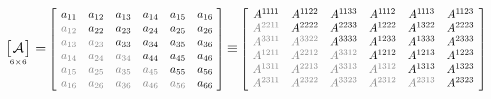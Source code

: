 \begin{gather*}%
\displaystyle
\asmatrixwithdimensions{\mathcal{A}}{6}{6}
\hspace{.1ex} = \hspace{-0.2ex}
\scalebox{.82}{$ \left[ \hspace{.4em}
   \begin{matrix}
      a_{11} & a_{12} & a_{13} & a_{14} & a_{15} & a_{16} \\
      \mathgray{a_{12}} & a_{22} & a_{23} & a_{24} & a_{25} & a_{26} \\
      \mathgray{a_{13}} & \mathgray{a_{23}} & a_{33} & a_{34} & a_{35} & a_{36} \\
      \mathgray{a_{14}} & \mathgray{a_{24}} & \mathgray{a_{34}} & a_{44} & a_{45} & a_{46} \\
      \mathgray{a_{15}} & \mathgray{a_{25}} & \mathgray{a_{35}} & \mathgray{a_{45}} & a_{55} & a_{56} \\
      \mathgray{a_{16}} & \mathgray{a_{26}} & \mathgray{a_{36}} & \mathgray{a_{46}} & \mathgray{a_{56}} & a_{66}
   \end{matrix}
\hspace{.32em} \right] $}
%
\hspace{-0.2ex} \equiv \hspace{-0.2ex}
%
\scalebox{.82}{$ \left[ \hspace{.4em}
   \begin{matrix}
     A^{\oneone\hspace{-0.1ex}\oneone} &
     A^{\oneone 22} &
     A^{\oneone 33} &
     A^{\oneone\hspace{-0.1ex}12} &
     A^{\oneone\hspace{-0.1ex}13} &
     A^{\oneone 23}
     \\
     \mathgray{A^{22\oneone}} &
     A^{2222} &
     A^{2233} &
     A^{1222} &
     A^{1322} &
     A^{2223}
     \\
     \mathgray{A^{33\oneone}} &
     \mathgray{A^{3322}} &
     A^{3333} &
     A^{1233} &
     A^{1333} &
     A^{2333}
     \\
     \mathgray{A^{12\oneone}} &
     \mathgray{A^{2212}} &
     \mathgray{A^{3312}} &
     A^{1212} &
     A^{1213} &
     A^{1223}
     \\
     \mathgray{A^{13\oneone}} &
     \mathgray{A^{2213}} &
     \mathgray{A^{3313}} &
     \mathgray{A^{1312}} &
     A^{1313} &
     A^{1323}
     \\
     \mathgray{A^{23\oneone}} &
     \mathgray{A^{2322}} &
     \mathgray{A^{3323}} &
     \mathgray{A^{2312}} &
     \mathgray{A^{2313}} &
     A^{2323}
   \end{matrix}
\hspace{.4em} \right] $}
\end{gather*}

